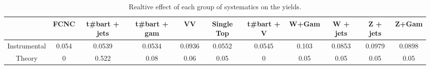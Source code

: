 \begin{table}[htbp]
\begin{center}
\begin{tabular}{|c|c|c|c|c|c|c|c|c|c|c|}
\hline 
      & FCNC      & t#bar{t} + jets      & t#bar{t} +  gam      & VV      & Single Top      & t#bar{t} + V      & W+Gam      & W + jets      & Z + jets      & Z+Gam \\ 
\hline 
 Instrumental & 0.054 & 0.0539 & 0.0534 & 0.0936 & 0.0552 & 0.0545 & 0.103 & 0.0853 & 0.0979 & 0.0898 \\ 
 Theory & 0 & 0.522 & 0.08 & 0.06 & 0.05 & 0 & 0.05 & 0.05 & 0.05 & 0.05 \\ 
\hline 
\end{tabular} 
\caption{Realtive effect of each group of systematics on the yields.} 
\end{center} 
\end{table} 
